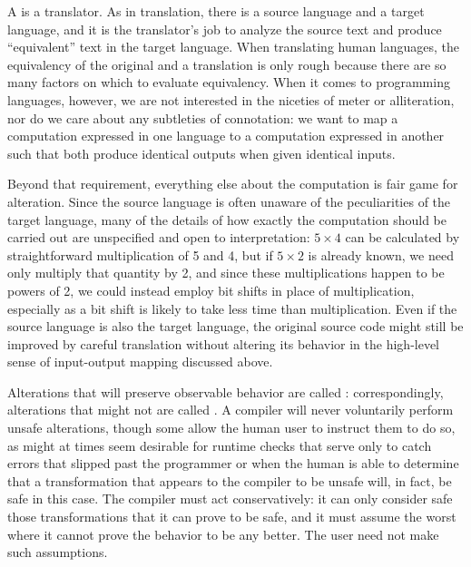 \label{background:compilers}
A  is a translator. As in translation, there is a source language and a target language, and it is the translator's job to analyze the source text and produce ``equivalent'' text in the target language. When translating human languages, the equivalency of the original and a translation is only rough because there are so many factors on which to evaluate equivalency. When it comes to programming languages, however, we are not interested in the niceties of meter or alliteration, nor do we care about any subtleties of connotation: we want to map a computation expressed in one language to a computation expressed in another such that both produce identical outputs when given identical inputs.

Beyond that requirement, everything else about the computation is fair game for alteration. Since the source language is often unaware of the peculiarities of the target language, many of the details of how exactly the computation should be carried out are unspecified and open to interpretation: $5 \times 4$ can be calculated by straightforward multiplication of 5 and 4, but if $5 \times 2$ is already known, we need only multiply that quantity by 2, and since these multiplications happen to be powers of 2, we could instead employ bit shifts in place of multiplication, especially as a bit shift is likely to take less time than multiplication. Even if the source language is also the target language, the original source code might still be improved by careful translation without altering its behavior in the high-level sense of input-output mapping discussed above.

Alterations that will preserve observable behavior are called : correspondingly, alterations that might not are called . A compiler will never voluntarily perform unsafe alterations, though some allow the human user to instruct them to do so, as might at times seem desirable for runtime checks that serve only to catch errors that slipped past the programmer or when the human is able to determine that a transformation that appears to the compiler to be unsafe will, in fact, be safe in this case. The compiler must act conservatively: it can only consider safe those transformations that it can prove to be safe, and it must assume the worst where it cannot prove the behavior to be any better. The user need not make such assumptions.


